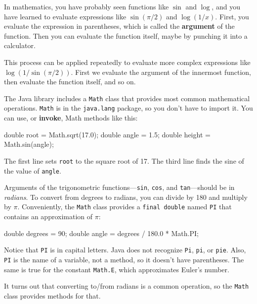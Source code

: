 \documentclass[12pt]{book}
\theoremstyle{exercise}
\newcommand{\java}[1]{\verb"#1"}
\newcommand{\java}[1]{\lstinline{#1}} %
\begin{document}

In mathematics, you have probably seen functions like $\sin$ and $\log$, and you have learned to evaluate expressions like $\sin(\pi/2)$ and $\log(1/x)$.
First, you evaluate the expression in parentheses, which is called the {\bf argument} of the function.
Then you can evaluate the function itself, maybe by punching it into a calculator.

This process can be applied repeatedly to evaluate more complex expressions like $\log(1/\sin(\pi/2))$.
First we evaluate the argument of the innermost function, then evaluate the function itself, and so on.

The Java library includes a \java{Math} class that provides most common mathematical operations.
\java{Math} is in the \java{java.lang} package, so you don't have to import it.
You can use, or {\bf invoke}, Math methods like this:

\begin{code}
    double root = Math.sqrt(17.0);
    double angle = 1.5;
    double height = Math.sin(angle);
\end{code}

The first line sets \java{root} to the square root of 17.
The third line finds the sine of the value of \java{angle}.


Arguments of the trigonometric functions---\java{sin}, \java{cos}, and \java{tan}---should be in {\em radians}.
To convert from degrees to radians, you can divide by 180 and multiply by $\pi$.
Conveniently, the \java{Math} class provides a \java{final double} named \java{PI} that contains an approximation of $\pi$:

\begin{code}
    double degrees = 90;
    double angle = degrees / 180.0 * Math.PI;
\end{code}

Notice that \java{PI} is in capital letters.
Java does not recognize \java{Pi}, \java{pi}, or \java{pie}.
Also, \java{PI} is the name of a variable, not a method, so it doesn't have parentheses.
The same is true for the constant \java{Math.E}, which approximates Euler's number.

It turns out that converting to/from radians is a common operation, so the \java{Math} class provides methods for that.
\end{document}
